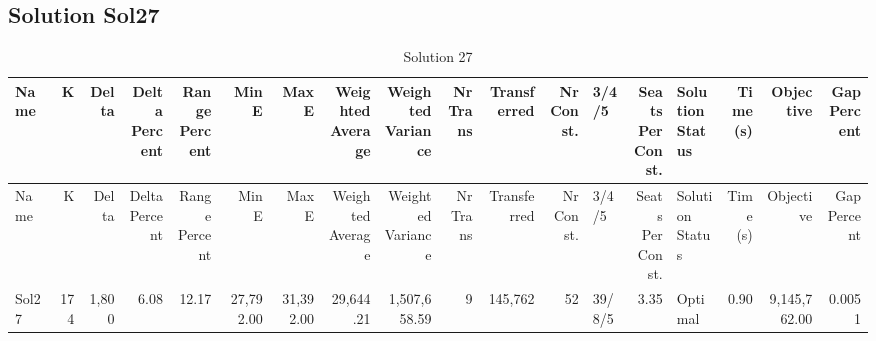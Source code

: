 \documentclass[a4paper]{article}
\begin{document}
\clearpage
\subsection{Solution Sol27}

{\scriptsize
\begin{longtable}{lrrrrrrrrrrrlrlrrr}
\caption{Solution 27}
\\ \toprule
Name &K &Delta &\shortstack{Delta\\Percent} &\shortstack{Range\\Percent} &Min E &Max E &\shortstack{Weighted\\Average} &\shortstack{Weighted\\Variance} &\shortstack{Nr\\Trans} &Transferred &\shortstack{Nr\\Const.} &3/4/5 &\shortstack{Seats\\Per\\Const.} &\shortstack{Solution\\Status} &\shortstack{Time\\(s)} &Objective &\shortstack{Gap\\Percent} \\ \midrule
\endfirsthead
\toprule
Name &K &Delta &\shortstack{Delta\\Percent} &\shortstack{Range\\Percent} &Min E &Max E &\shortstack{Weighted\\Average} &\shortstack{Weighted\\Variance} &\shortstack{Nr\\Trans} &Transferred &\shortstack{Nr\\Const.} &3/4/5 &\shortstack{Seats\\Per\\Const.} &\shortstack{Solution\\Status} &\shortstack{Time\\(s)} &Objective &\shortstack{Gap\\Percent} \\ \midrule
\endhead
\bottomrule
\endfoot
Sol27&174&1,800& 6.08&12.17&27,792.00&31,392.00&29,644.21&1,507,658.59&9&145,762&52&39/8/5& 3.35&Optimal& 0.90&9,145,762.00&0.0051\\ 
\end{longtable}

}
\end{document}
